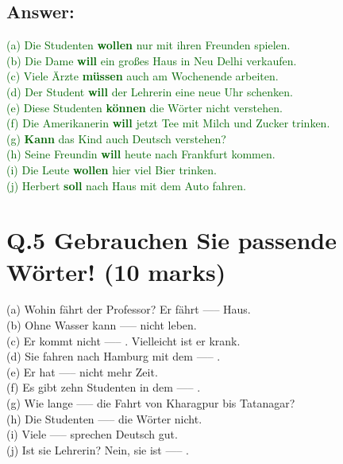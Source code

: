 \documentclass[a4paper,12pt]{article}
\begin{document}
\subsection*{Answer:}
\textcolor{darkgreen}{(a) Die Studenten \textbf{wollen} nur mit ihren Freunden spielen.}\\
\textcolor{darkgreen}{(b) Die Dame \textbf{will} ein großes Haus in Neu Delhi verkaufen.}\\
\textcolor{darkgreen}{(c) Viele Ärzte \textbf{müssen} auch am Wochenende arbeiten.}\\
\textcolor{darkgreen}{(d) Der Student \textbf{will} der Lehrerin eine neue Uhr schenken.}\\
\textcolor{darkgreen}{(e) Diese Studenten \textbf{können} die Wörter nicht verstehen.}\\
\textcolor{darkgreen}{(f) Die Amerikanerin \textbf{will} jetzt Tee mit Milch und Zucker trinken.}\\
\textcolor{darkgreen}{(g) \textbf{Kann} das Kind auch Deutsch verstehen?}\\
\textcolor{darkgreen}{(h) Seine Freundin \textbf{will} heute nach Frankfurt kommen.}\\
\textcolor{darkgreen}{(i) Die Leute \textbf{wollen} hier viel Bier trinken.}\\
\textcolor{darkgreen}{(j) Herbert \textbf{soll} nach Haus mit dem Auto fahren.}
\vspace{1cm}

\section*{Q.5 Gebrauchen Sie passende Wörter! (10 marks)}

(a) Wohin fährt der Professor? Er fährt ----- Haus.\\
(b) Ohne Wasser kann ----- nicht leben.\\
(c) Er kommt nicht ----- . Vielleicht ist er krank.\\
(d) Sie fahren nach Hamburg mit dem ----- .\\
(e) Er hat ----- nicht mehr Zeit.\\
(f) Es gibt zehn Studenten in dem ----- .\\
(g) Wie lange ----- die Fahrt von Kharagpur bis Tatanagar?\\
(h) Die Studenten ----- die Wörter nicht.\\
(i) Viele ----- sprechen Deutsch gut.\\
(j) Ist sie Lehrerin? Nein, sie ist ----- .
\end{document}
